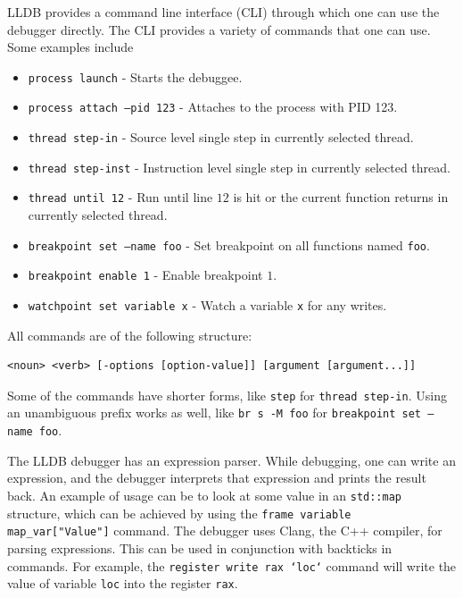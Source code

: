 LLDB provides a command line interface (CLI) through which one can use the
debugger directly. The CLI provides a variety of commands that one can use.
Some examples include
\begin{itemize}
    \item \texttt{process launch} - Starts the debuggee.
    \item \texttt{process attach --pid 123} - Attaches to the process with PID
        123.
    \item \texttt{thread step-in} - Source level single step in currently selected thread.
    \item \texttt{thread step-inst} - Instruction level single step in currently selected thread.
    \item \texttt{thread until 12} - Run until line $12$ is hit or the current
        function returns in currently selected thread.
    \item \texttt{breakpoint set --name foo} - Set breakpoint on all functions
        named \texttt{foo}.
    \item \texttt{breakpoint enable 1} - Enable breakpoint $1$.
    \item \texttt{watchpoint set variable x} - Watch a variable \texttt{x} for
        any writes.
\end{itemize}
All commands are of the following structure:
\begin{lstlisting}
<noun> <verb> [-options [option-value]] [argument [argument...]]
\end{lstlisting}
Some of the commands have shorter forms, like \texttt{step} for \texttt{thread
step-in}. Using an unambiguous prefix works as well, like \texttt{br s -M foo}
for \texttt{breakpoint set --name foo}.

The LLDB debugger has an expression parser. While debugging, one can write an
expression, and the debugger interprets that expression and prints the result
back. An example of usage can be to look at some value in an \texttt{std::map}
structure, which can be achieved by using the \texttt{frame variable
map\_var["Value"]} command. The debugger uses Clang, the C++ compiler, for
parsing expressions. This can be used in conjunction with backticks in
commands. For example, the \texttt{register write rax `loc`} command will write
the value of variable \texttt{loc} into the register \texttt{rax}.
